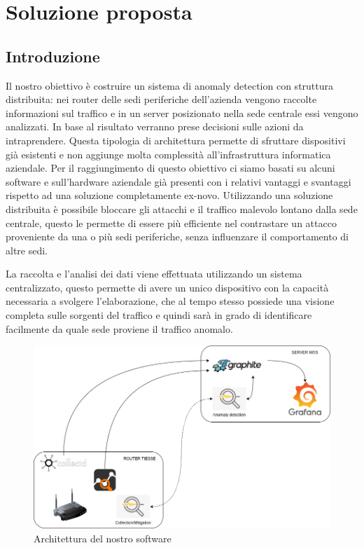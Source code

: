 \chapter{Soluzione proposta}

\section{Introduzione}
Il nostro obiettivo è costruire un sistema di anomaly detection con struttura distribuita: nei router delle sedi periferiche dell'azienda vengono raccolte informazioni sul traffico e in un server posizionato nella sede centrale essi vengono analizzati. In base al risultato verranno prese decisioni sulle azioni da intraprendere. Questa tipologia di architettura permette di sfruttare dispositivi già esistenti e non aggiunge molta complessità all'infrastruttura informatica aziendale. Per il raggiungimento di questo obiettivo ci siamo basati su alcuni software e sull'hardware aziendale già presenti con i relativi vantaggi e svantaggi rispetto ad una soluzione completamente ex-novo.
Utilizzando una soluzione distribuita è possibile bloccare gli attacchi e il traffico malevolo lontano dalla sede centrale, questo le permette di essere più efficiente nel contrastare un attacco proveniente da una o più sedi periferiche, senza influenzare il comportamento di altre sedi.

La raccolta e l'analisi dei dati viene effettuata utilizzando un sistema centralizzato, questo permette di avere un unico dispositivo con la capacità necessaria a svolgere l'elaborazione, che al tempo stesso possiede una visione completa sulle sorgenti del traffico e quindi sarà in grado di identificare facilmente da quale sede proviene il traffico anomalo.

\begin{figure}[]
    \label{fig:funzionamento}
    \includegraphics[width=\hsize]{images/my_work/funzionamento.png}
    \caption{Architettura del nostro software}
    \centering
\end{figure}


